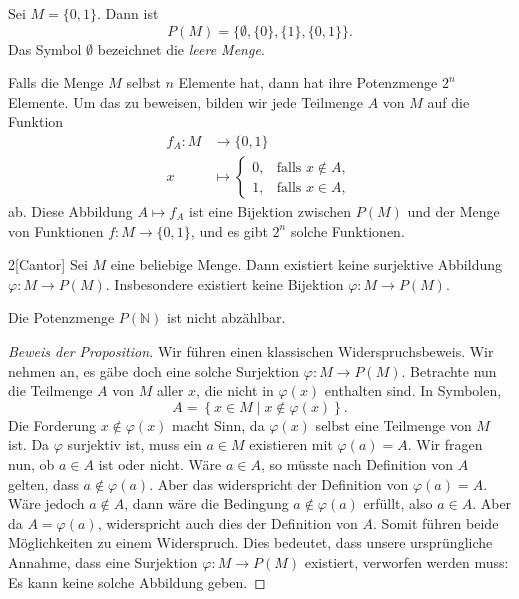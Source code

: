 \documentclass[../main.tex]{subfiles}
\begin{document}
\begin{example}
  Sei $M = \{0, 1\}$. Dann ist
  \[
    P(M) = \{ \emptyset, \{0\}, \{1\}, \{0, 1\}\}.
  \]
  Das Symbol $\emptyset$ bezeichnet die \emph{leere Menge}.
\end{example}

\begin{remark}
  Falls die Menge $M$ selbst $n$ Elemente hat, dann hat ihre
  Potenzmenge $2^{n}$ Elemente. Um das zu beweisen,
  bilden wir jede Teilmenge $A$ von $M$
  auf die Funktion
  \begin{align*}
    f_{A} \colon  M &\to \{0, 1\} \\
     x &\mapsto
      \begin{cases}
        0, & \mbox{falls } x \notin A, \\
        1, & \mbox{falls } x \in A,
      \end{cases}
  \end{align*}
  ab.
  Diese Abbildung $A \mapsto f_{A}$ ist eine Bijektion zwischen
  $P(M)$ und der Menge von Funktionen $f \colon M \to \{0, 1\}$,
  und es gibt $2^{n}$
  solche Funktionen.
\end{remark}

\begin{manualproposition}{2}[Cantor]\label{prop:cantor}
  Sei $M$ eine beliebige Menge.
  Dann existiert keine surjektive Abbildung $\varphi \colon M \to P(M)$.
  Insbesondere existiert keine Bijektion $\varphi \colon M \to P(M)$.
\end{manualproposition}

\begin{corollary}
  Die Potenzmenge $P(\mathbb N)$ ist nicht abzählbar.
\end{corollary}

\begin{proof}[Beweis der Proposition]
  Wir führen einen klassischen Widerspruchsbeweis.
  Wir nehmen an, es gäbe doch eine solche Surjektion
  $\varphi \colon M \to P(M)$.
  Betrachte nun die Teilmenge $A$ von $M$ aller $x$, die nicht
  in $\varphi(x)$ enthalten sind. In Symbolen,
  \[
    A = \left\{x \in M \mid x \notin \varphi(x)\right\}.
  \]
  Die Forderung $x \notin \varphi(x)$ macht Sinn,
  da $\varphi(x)$ selbst eine Teilmenge von $M$ ist.
  Da $\varphi$ surjektiv ist, muss ein $a \in M$
  existieren mit $\varphi(a) = A$. Wir fragen nun,
  ob $a \in A$ ist oder nicht.
  Wäre $a \in A$, so müsste nach Definition von $A$
  gelten, dass $a \notin \varphi(a)$. Aber das
  widerspricht der Definition von $\varphi(a) = A$.
  Wäre jedoch $a \notin A$, dann wäre die Bedingung
  $a \notin \varphi(a)$ erfüllt, also $a \in A$.
  Aber da $A = \varphi(a)$, widerspricht auch dies
  der Definition von $A$. Somit führen beide Möglichkeiten
  zu einem Widerspruch. Dies bedeutet, dass unsere
  ursprüngliche Annahme, dass eine Surjektion
  $\varphi \colon M \to P(M)$ existiert, verworfen werden muss:
  Es kann keine solche Abbildung geben.
\end{proof}
\end{document}
